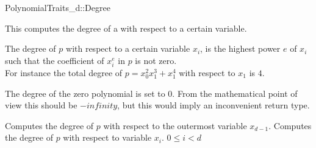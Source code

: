 \begin{ccRefConcept}{PolynomialTraits_d::Degree}

\ccDefinition

This  computes the degree 
of a  with respect to a certain variable. 

The degree of $p$ with respect to a certain variable $x_i$, 
is the highest power $e$ of $x_i$ such that the coefficient of $x_i^{e}$ in 
$p$ is not zero.\\
For instance the total degree of $p = x_0^2x_1^3+x_1^4$ with respect to $x_1$ is $4$.

The degree of the zero polynomial is set to $0$. From the mathematical point of view this should 
be $-infinity$, but this would imply an inconvenient return type. 

 

\ccRefines 
{}


\ccTypes


\ccGlue
{}

\ccOperations
{}
         {Computes the degree of $p$ with respect to the outermost variable $x_{d-1}$.}
         {Computes the degree of $p$ with respect to variable $x_i$.
         \ccPrecond $0 \leq i  < d$
         }


\ccSeeAlso

\\
\\
\\

\end{ccRefConcept}
